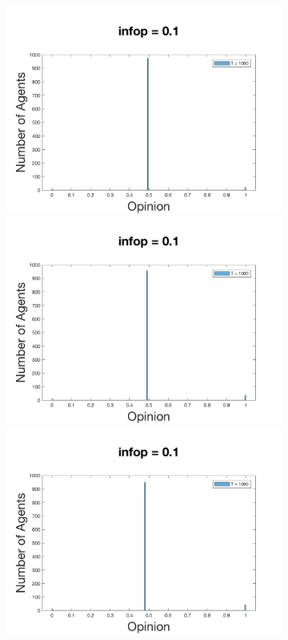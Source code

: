 \documentclass[11pt]{article}
\begin{document}
\begin{figure}[!htb]
\begin{subfigure}[t]{\textwidth}
  \includegraphics[width=\linewidth]{p_5/gen_plot_201712171365061157e+01.png}
\endminipage\hfill
{}
  \includegraphics[width=\linewidth]{p_10/gen_plot_2017121712593240672e+01.png}
\endminipage\hfill
{}
  \includegraphics[width=\linewidth]{p_20/gen_plot_201712171361168753e+01.png}

\end{subfigure}
\end{figure}
\end{document}
